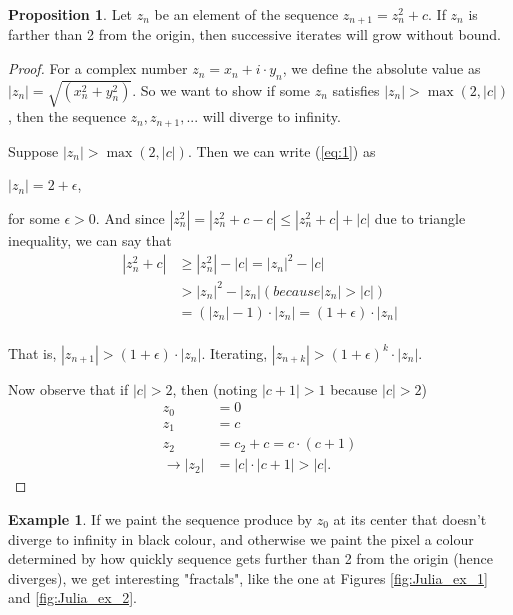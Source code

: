 \documentclass[a4paper,11pt]{article}
\theoremstyle{definition}
\newtheorem{prop}[defn]{Proposition}
\newtheorem{exmp}[defn]{Example}
\numberwithin{equation}{section} %
\begin{document}
\begin{prop}
    Let $z_n$ be an element of the sequence $z_{n+1} = z_n^2 + c$. If $z_n$ is farther than 2 from the origin, then successive iterates will grow without bound.
\end{prop}
\begin{proof}
    For a complex number $z_n = x_n + i \cdot y_n$, we define the absolute value as $|z_n| = \sqrt{(x_n^2 + y_n^2)}$. So we want to show if some $z_n$ satisfies $|z_n| > \max (2, |c|)$, then the sequence $z_n, z_{n+1},...$ will diverge to infinity. 

    Suppose $|z_n| > \max (2, |c|)$. Then we can write (\ref{eq:1}) as 
    \begin{center}
        $|z_n| = 2 + \epsilon$,
    \end{center}
    for some $\epsilon > 0$. And since $|z_n^2| = |z_n^2 + c - c| \le |z_n^2 + c| + |c|$ due to triangle inequality, we can say that
    \begin{align*}
        |z_n^2 + c| &\ge |z_n^2| - |c| = |z_n|^2 - |c| \\
        &> |z_n|^2 - |z_n| (because |z_n| > |c|) \\
        &= (|z_n| - 1)\cdot|z_n| = (1 + \epsilon)\cdot|z_n| \\
    \end{align*}

    That is, $|z_{n+1}| > (1 + \epsilon)\cdot|z_n|$. Iterating, $|z_{n+k}| > (1 + \epsilon)^k\cdot|z_n|$.

    Now observe that if $|c| > 2$, then (noting $|c + 1| > 1$ because $|c| > 2$)
    \begin{align*}
            z_0 &= 0 \\
            z_1 &= c \\
            z_2 &= c_2 + c = c\cdot(c + 1) \\
            \rightarrow |z_2| &= |c|\cdot|c + 1| > |c|.
    \end{align*} 
    
\end{proof}


\begin{exmp}
    If we paint the sequence produce by $z_0$ at its center that doesn't diverge to infinity in black colour, and otherwise we paint the pixel a colour determined by how quickly sequence gets further than 2 from the origin (hence diverges), we get interesting "fractals", like the one at Figures \ref{fig:Julia_ex_1} and \ref{fig:Julia_ex_2}.
\end{exmp}
\end{document}
